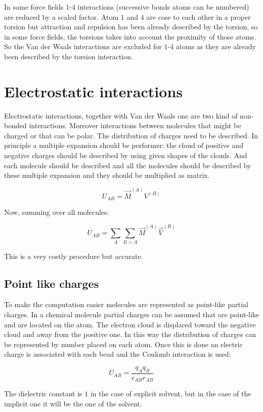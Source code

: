 	In some force fields $1$-$4$ interactions (successive bonds atoms can be numbered) are reduced by a scaled factor.
	Atom $1$ and $4$ are cose to each other in a proper torsion but attraction and repulsion has been already described by the torsion, so in some force fields, the torsions takes into account the proximity of those atoms.
	So the Van der Waals interactions are excluded for $1$-$4$ atoms as they are already been described by the torsion interaction.


\section{Electrostatic interactions}
Electrostatic interactions, together with Van der Waals one are two kind of non-bonded interactions.
Moreover interactions between molecules that might be charged or that can be polar.
The distribution of charges need to be described.
In principle a multiple expansion should be performer: the cloud of positive and negative charges should be described by using given shapes of the clouds.
And each molecule should be described and all the molecules should be described by these multiple expansion and they should be multiplied as matrix.

$$U_{AB} = \vec{M}^{(A)}V^{(B)}$$

Now, summing over all molecules:

$$U_{AB} = \sum\limits_{A}\sum\limits_{B>A}\vec{M}^{(A)}\vec{V}^{(B)}$$

This is a very costly procedure but accurate.

	\subsection{Point like charges}
	To make the computation easier molecules are represented as point-like partial charges.
	In a chemical molecule partial charges can be assumed that are point-like and are located on the atom.
	The electron cloud is displaced toward the negative cloud and away from the positive one.
	In this way the distribution of charges can be represented by number placed on each atom.
	Once this is done an electric charge is associated with each bead and the Coulomb interaction is used:

	$$U_{AB} = \frac{q_Aq_B}{\epsilon_{AB}r_{AB}}$$

	The dielectric constant is $1$ in the case of explicit solvent, but in the case of the implicit one it will be the one of the solvent.

